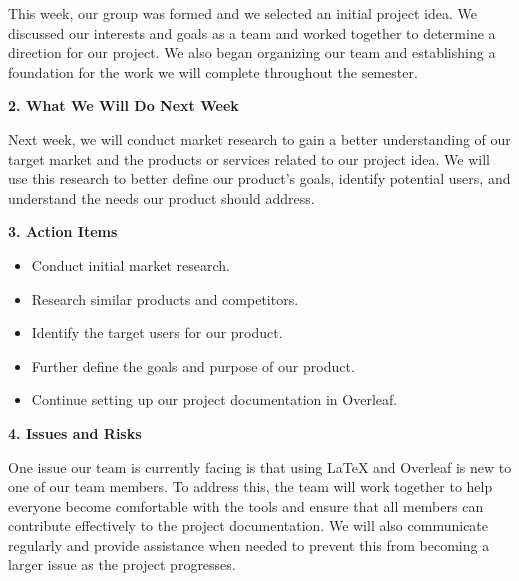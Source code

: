 This week, our group was formed and we selected an initial project idea. We discussed our interests and goals as a team and worked together to determine a direction for our project. We also began organizing our team and establishing a foundation for the work we will complete throughout the semester.

\noindent\textbf{2. What We Will Do Next Week}

Next week, we will conduct market research to gain a better understanding of our target market and the products or services related to our project idea. We will use this research to better define our product's goals, identify potential users, and understand the needs our product should address.

\noindent\textbf{3. Action Items}
\begin{itemize}
\item Conduct initial market research.
\item Research similar products and competitors.
\item Identify the target users for our product.
\item Further define the goals and purpose of our product.
\item Continue setting up our project documentation in Overleaf.
\end{itemize}

\noindent\textbf{4. Issues and Risks}

One issue our team is currently facing is that using \LaTeX{} and Overleaf is new to one of our team members. To address this, the team will work together to help everyone become comfortable with the tools and ensure that all members can contribute effectively to the project documentation. We will also communicate regularly and provide assistance when needed to prevent this from becoming a larger issue as the project progresses.
